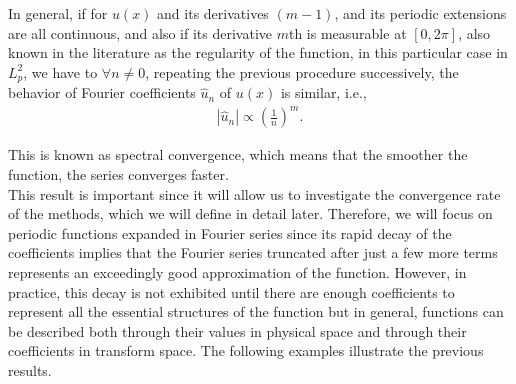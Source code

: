 	In general, if for $u(x)$ and its derivatives $(m - 1)$, and its periodic extensions are all continuous, and also if its derivative $m$th is measurable at $[0, 2 \pi]$, also known in the literature as the regularity of the function, in this particular case in $L^2_p$, we have to $\forall n \neq 0$, repeating the previous procedure successively, the behavior of Fourier coefficients $\hat{u}_n$ of $u(x)$ is similar, i.e.,
	\begin{align*}
		|\hat{u}_n| \propto \left(\frac{1}{n}\right)^m.
	\end{align*}
	
	 This is known as spectral convergence, which means that the smoother the function, the series converges faster.\\
	 
	 This result is important since it will allow us to investigate the convergence rate of the methods, which we will define in detail later. Therefore, we will focus on periodic functions expanded in Fourier series since its rapid decay of the coefficients implies that the Fourier series truncated after just a few more terms represents an exceedingly good approximation of the function. However, in practice, this decay is not exhibited until there are enough coefficients to represent all the essential structures of the function but in general, functions can be described both through their values in physical space and through their coefficients in transform space. The following examples illustrate the previous results. \\
	 
